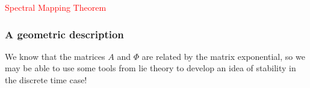 \textcolor{red}{Spectral Mapping Theorem}

\subsubsection{A geometric description}



We know that the matrices $A$ and $\Phi$ are related by the matrix exponential, so we may be able to use some tools from \gls{lie theory} to develop an idea of stability in the discrete time case!

